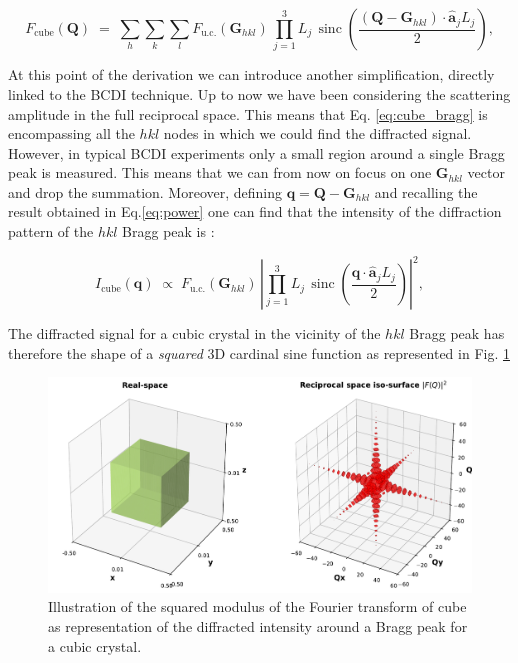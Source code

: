 \begin{equation}
    F_{\text{cube}}(\mathbf Q) \;=\; 
    \sum_{h} \sum_{k} \sum_{l} F_{\text{u.c.}}(\mathbf{G}_{hkl})\,
    \prod_{j=1}^{3} L_j \,\!\operatorname{sinc}\left(\frac{(\mathbf{Q}- \mathbf{G}_{hkl}) \cdot \mathbf{\hat{a}}_j L_j}{2}\right),
    \label{eq:cube_bragg}
\end{equation}

At this point of the derivation we can introduce another simplification, directly linked to the BCDI technique.
Up to now we have been considering the scattering amplitude in the full reciprocal space. This means that Eq. \ref{eq:cube_bragg}
is encompassing all the $hkl$ nodes in which we could find the diffracted signal. However, in typical BCDI experiments 
only a small region around a single Bragg peak is measured. This means that we can from now on focus on one $\mathbf{G}_{hkl}$ 
vector and drop the summation.  Moreover, defining $\mathbf q = \mathbf{Q}- \mathbf{G}_{hkl}$ and recalling the result obtained in Eq.\ref{eq:power} 
one can find that the intensity of the diffraction pattern of the $hkl$ Bragg peak is : 

\begin{equation}
    I_{\text{cube}}(\mathbf q) \;\propto\; 
    F_{\text{u.c.}}(\mathbf{G}_{hkl})\,
    \left | \prod_{j=1}^{3} L_j \,\!\operatorname{sinc}\left(\frac{\mathbf{q} \cdot \mathbf{\hat{a}}_j L_j}{2}\right)\right|^2,
    \label{eq:cube_bragg2}
\end{equation}

The diffracted signal for a cubic crystal in the vicinity of the $hkl$ Bragg peak has therefore 
the shape of a \textit{squared} 3D cardinal sine function as represented in Fig. \ref{fig:cube}

\begin{figure}[H]
    \centering
    \includegraphics[width=\textwidth]{figures/Intro/cube1.pdf}
    \caption{Illustration of the squared modulus of the Fourier transform of cube as representation of the diffracted 
    intensity around a Bragg peak for a cubic crystal. }
    \label{fig:cube}
\end{figure}

